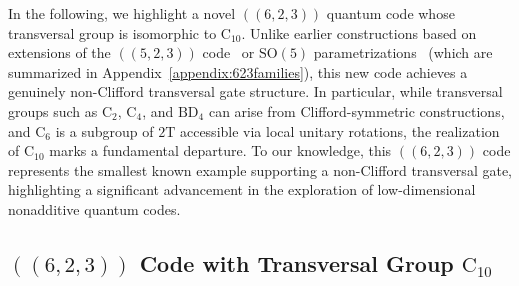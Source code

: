 \documentclass[8pt]{article}
\theoremstyle{definition}
\begin{document}
In the following, we highlight a novel \(((6,2,3))\) quantum code whose transversal group is isomorphic to \(\mathrm{C}_{10}\). Unlike earlier constructions based on extensions of the \(((5,2,3))\) code~\cite{Cao_2022} or \(\mathrm{SO}(5)\) parametrizations~\cite{du2024characterizing} (which are summarized in Appendix~\ref{appendix:623families}), this new code achieves a genuinely non-Clifford transversal gate structure. In particular, while transversal groups such as \(\mathrm{C}_2\), \(\mathrm{C}_4\), and \(\mathrm{BD}_4\) can arise from Clifford-symmetric constructions, and \(\mathrm{C}_6\) is a subgroup of \(2\mathrm{T}\) accessible via local unitary rotations, the realization of \(\mathrm{C}_{10}\) marks a fundamental departure. To our knowledge, this \(((6,2,3))\) code represents the smallest known example supporting a non-Clifford transversal gate, highlighting a significant advancement in the exploration of low-dimensional nonadditive quantum codes.

\subsection{\texorpdfstring{$((6,2,3))$}{((6,2,3))} Code with Transversal Group \texorpdfstring{$\mathrm{C}_{10}$}{C₁₀}}
\end{document}

